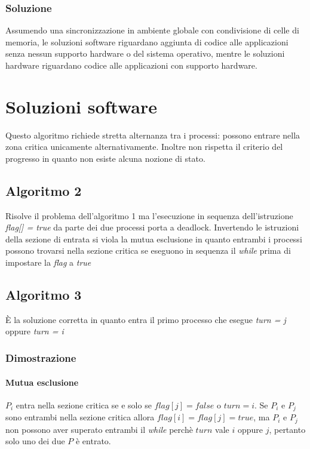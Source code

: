 \subsubsection{Soluzione}
Assumendo una sincronizzazione in ambiente globale con condivisione di celle di memoria, le soluzioni software riguardano aggiunta di codice alle applicazioni senza nessun supporto 
hardware o del sistema operativo, mentre le soluzioni hardware riguardano codice alle applicazioni con supporto hardware. 
\section{Soluzioni software}

Questo algoritmo richiede stretta alternanza tra i processi: possono entrare nella zona critica unicamente alternativamente. Inoltre non rispetta il criterio del progresso in quanto
non esiste alcuna nozione di stato.
\subsection{Algoritmo 2}

Risolve il problema dell'algoritmo 1 ma l'esecuzione in sequenza dell'istruzione \emph{flag[] = true} da parte dei due processi porta a deadlock. Invertendo le istruzioni della sezione
di entrata si viola la mutua esclusione in quanto entrambi i processi possono trovarsi nella sezione critica se eseguono in sequenza il \emph{while} prima di impostare la \emph{flag} a
\emph{true}
\subsection{Algoritmo 3}

\`E la soluzione corretta in quanto entra il primo processo che esegue \emph{turn = j} oppure \emph{turn = i}
\subsubsection{Dimostrazione}
\paragraph{Mutua esclusione}
$P_i$ entra nella sezione critica se e solo se $flag[j] = false$ o $turn = i$. Se $P_i$ e $P_j$ sono entrambi nella sezione critica allora $flag[i]=flag[j]=true$, ma $P_i$ e $P_j$ non
possono aver superato entrambi il \emph{while} perch\`e $turn$ vale $i$ oppure $j$, pertanto solo uno dei due $P$ \`e entrato. 
